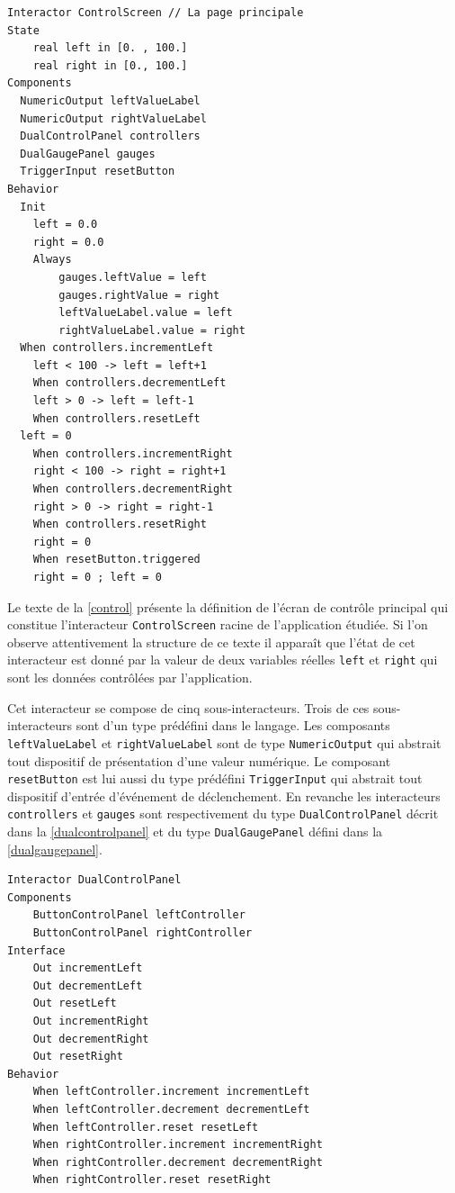 \documentclass{ihm}
\begin{document}
\begin{lstlisting}[float=ht!,
                   mathescape,
                   caption=\'Ecran de contrôle principal,
                   label=control,
                   frame=single]
Interactor ControlScreen // La page principale
State
	real left in [0. , 100.]
	real right in [0., 100.]
Components
  NumericOutput leftValueLabel
  NumericOutput rightValueLabel
  DualControlPanel controllers
  DualGaugePanel gauges
  TriggerInput resetButton
Behavior
  Init
    left = 0.0
    right = 0.0
	Always
		gauges.leftValue = left
		gauges.rightValue = right	
		leftValueLabel.value = left
		rightValueLabel.value = right
  When controllers.incrementLeft
	left < 100 -> left = left+1 
	When controllers.decrementLeft
	left > 0 -> left = left-1
	When controllers.resetLeft 
  left = 0
	When controllers.incrementRight
	right < 100 -> right = right+1
	When controllers.decrementRight
	right > 0 -> right = right-1
	When controllers.resetRight
	right = 0
	When resetButton.triggered
	right = 0 ; left = 0
\end{lstlisting}

Le texte de la \autoref{control} présente la définition  de l'écran de
contrôle       principal       qui       constitue       l'interacteur
\lstinline$ControlScreen$  racine de  l'application étudiée.   Si l'on
observe attentivement la structure de  ce texte il apparaît que l'état
de cet interacteur  est donné par la valeur de  deux variables réelles
\lstinline$left$ et \lstinline$right$ qui  sont les données contrôlées
par l'application.

Cet interacteur  se compose  de cinq  sous-interacteurs. Trois  de ces
sous-interacteurs  sont  d'un type  prédéfini  dans  le langage.   Les
composants  \lstinline$leftValueLabel$ et  \lstinline$rightValueLabel$
sont de type \lstinline$NumericOutput$ qui abstrait tout dispositif de
présentation     d'une     valeur     numérique.      Le     composant
\lstinline$resetButton$    est   lui    aussi   du    type   prédéfini
\lstinline$TriggerInput$   qui  abstrait   tout  dispositif   d'entrée
d'événement   de   déclenchement.    En  revanche   les   interacteurs
\lstinline$controllers$ et  \lstinline$gauges$ sont  respectivement du
type       \lstinline$DualControlPanel$      décrit       dans      la
\autoref{dualcontrolpanel}   et  du   type  \lstinline$DualGaugePanel$
défini dans la \autoref{dualgaugepanel}.


\begin{lstlisting}[float=htb!,
                   mathescape,
                   caption=Panneau de contrôle,
                   label=dualcontrolpanel,
                   frame=single]
Interactor DualControlPanel
Components
	ButtonControlPanel leftController
	ButtonControlPanel rightController
Interface
	Out incrementLeft
	Out decrementLeft
	Out resetLeft
	Out incrementRight
	Out decrementRight
	Out resetRight
Behavior
	When leftController.increment incrementLeft
	When leftController.decrement decrementLeft
	When leftController.reset resetLeft
	When rightController.increment incrementRight
	When rightController.decrement decrementRight
	When rightController.reset resetRight
\end{lstlisting}
\end{document}
